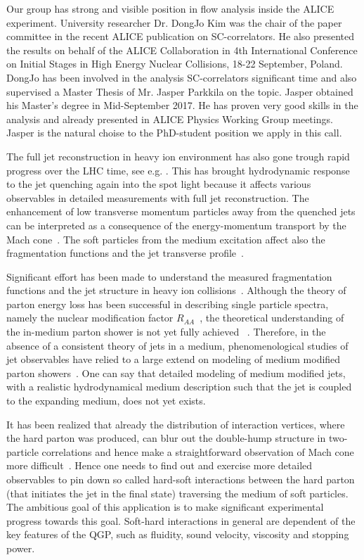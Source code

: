 Our group has strong and visible position in flow analysis inside the ALICE experiment. University researcher Dr. DongJo Kim was the chair of the paper committee in the recent ALICE publication \cite{Acharya:2017gsw} on SC-correlators. He also presented the results on behalf of the ALICE Collaboration in 4th International Conference on Initial Stages in High Energy Nuclear Collisions, 18-22 September, Poland. DongJo has been involved in the analysis SC-correlators significant time and also supervised a Master Thesis of Mr. Jasper Parkkila on the topic. Jasper obtained his Master's degree in Mid-September 2017. He has proven very good skills in the analysis and already presented in ALICE Physics Working Group meetings. Jasper is the natural choise to the PhD-student position we apply in this call.

The full jet reconstruction in heavy ion environment has also gone trough rapid progress over the LHC time, see e.g. \cite{Abelev:2013kqa}. This has brought hydrodynamic response to the jet quenching again into the spot light because it affects various observables in detailed measurements with full jet reconstruction. The enhancement of low transverse momentum particles away from the quenched jets can be interpreted as a consequence of the energy-momentum transport by the Mach cone~\cite{Tachibana:2014lja}. 
The soft particles from the medium excitation affect also the fragmentation functions and the jet transverse profile~\cite{He:2015pra}.

Significant effort has been made to understand the measured fragmentation functions and the jet structure in heavy ion collisions~\cite{Chatrchyan:2011sx,Chatrchyan:2013kwa,Chatrchyan:2014ava,Adam:2015ewa,Khachatryan:2016erx}. Although the theory of parton energy loss has been successful in describing single particle spectra, namely the nuclear modification factor $R_{AA}$~\cite{Aamodt:2010jd}, the theoretical understanding of the in-medium parton shower is not yet fully achieved ~\cite{PhysRevLett.106.122002}. Therefore, in the absence of a consistent theory of jets in a medium, phenomenological studies of jet observables have relied to a large extend on modeling of medium modified parton showers~\cite{Armesto:2008qh,Renk:2010zx}. One can say that detailed modeling of medium modified jets, with a realistic hydrodynamical medium description such that the jet is coupled to the expanding medium, does not yet exists.

It has been realized that already the distribution of interaction vertices, where the hard parton was produced, can blur out the double-hump structure in two-particle correlations and hence make a straightforward observation of Mach cone more difficult~\cite{Tachibana:2015qxa}. Hence one needs to find out and exercise more detailed observables to pin down so called hard-soft interactions between the hard parton (that initiates the jet in the final state) traversing the medium of soft particles. The ambitious goal of this application is to make significant experimental progress towards this goal. Soft-hard interactions in general are dependent of the key features of the QGP, such as fluidity, sound velocity, viscosity and stopping power.

